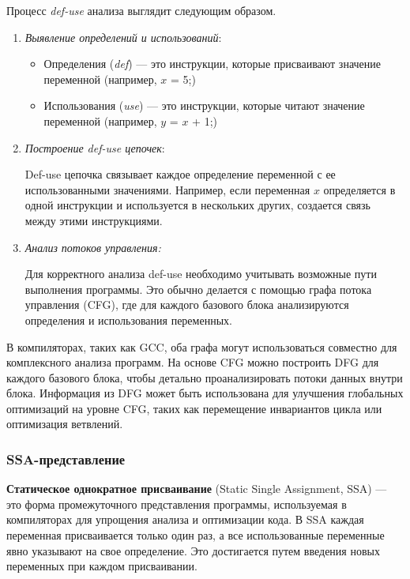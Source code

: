 Процесс \textit{def-use} анализа выглядит следующим образом.
\begin{enumerate}
    \item \textit{Выявление определений и использований}:
        \begin{itemize}
            \item Определения (\textit{def}) — это инструкции, которые присваивают значение переменной (например, $x$ = 5;)
            \item Использования (\textit{use}) — это инструкции, которые читают значение переменной (например, $y$ = $x$ + 1;)
        \end{itemize}
    \item \textit{Построение def-use цепочек}:

    Def-use цепочка связывает каждое определение переменной с ее использованными значениями. Например, если переменная $x$ определяется в одной инструкции и используется в нескольких других, создается связь между этими инструкциями.
    \item \textit{Анализ потоков управления:}
    
    Для корректного анализа def-use необходимо учитывать возможные пути выполнения программы. Это обычно делается с помощью графа потока управления (CFG), где для каждого базового блока анализируются определения и использования переменных.
\end{enumerate}

В компиляторах, таких как GCC, оба графа могут использоваться совместно для комплексного анализа программ. На основе CFG можно построить DFG для каждого базового блока, чтобы детально проанализировать потоки данных внутри блока. Информация из DFG может быть использована для улучшения глобальных оптимизаций на уровне CFG, таких как перемещение инвариантов цикла или оптимизация ветвлений.

\subsubsection{SSA-представление}


\textbf{Статическое однократное присваивание} (Static Single Assignment, SSA) — это форма промежуточного представления программы, используемая в компиляторах для упрощения анализа и оптимизации кода. В SSA каждая переменная присваивается только один раз, а все использованные переменные явно указывают на свое определение. Это достигается путем введения новых переменных при каждом присваивании.

